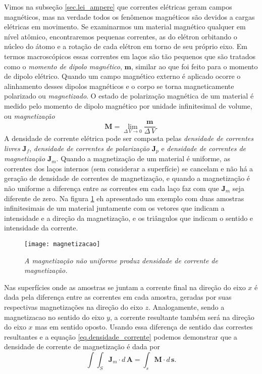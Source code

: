 Vimos na subseç\~ao \ref{sec.lei_ampere} que correntes el\'etricas geram campos magn\'eticos, mas na verdade todos os fen\^omenos magn\'eticos são devidos a cargas el\'etricas em movimento. Se examinarmos um material magn\'etico qualquer em n\'ivel at\^omico, encontraremos pequenas correntes, as do el\'etron orbitando o n\'ucleo do \'atomo e a rota\c{c}\~ao de cada el\'etron em torno de seu pr\'oprio eixo. Em termos macrosc\'opicos essas correntes em la\c{c}os s\~ao t\~ao pequenos que s\~ao tratados como o \textit{momento de dipolo magn\'etico}, $\mathbf{m}$, similar ao que foi feito para o momento de dipolo el\'etrico. Quando um campo magn\'etico externo \'e aplicado ocorre o alinhamento desses dipolos magn\'eticos e o corpo se torna magneticamente polarizado ou \textit{magnetizado}. O estado de polariza\c{c}\~ao magn\'etica de um material \'e medido pelo momento de dipolo magn\'etico por unidade infinitesimal de volume, ou \textit{magnetiza\c{c}\~ao}
\begin{equation*}
\mathbf{M}=\lim_{\Delta\,V\to 0}\frac{\mathbf{m}}{\Delta\,V}.
\end{equation*}   
A densidade de corrente el\'etrica pode ser composta pelas \textit{densidade de correntes livres} $\mathbf{J}_f$, \textit{densidade de correntes de polariza\c{c}\~ao} $\mathbf{J}_p$ e \textit{densidade de correntes de magnetiza\c{c}\~ao} $\mathbf{J}_m$. Quando a magnetiza\c{c}\~ao de um material \'e uniforme, as correntes dos la\c{c}os internos (sem considerar a superf\'icie) se cancelam e n\~ao h\'a a gera\c{c}\~ao de densidade de correntes de magnetiza\c{c}\~ao, e quando a magnetiza\c{c}\~ao \'e n\~ao uniforme a diferen\c{c}a entre as correntes em cada la\c{c}o faz com que $\mathbf{J}_m$ seja diferente de zero. Na figura \ref{fig.magnetizacao} eh apresentado um exemplo com duas amostras infinitesimais de um material juntamente com os vetores que indicam a intensidade e a dire\c{c}\~ao da magnetiza\c{c}\~ao, e os tri\^angulos que indicam o sentido e intensidade da corrente.
\begin{figure}
\centering
\texttt{[image: magnetizacao]}
\caption{\textit{A magnetiza\c{c}\~ao n\~ao uniforme produz densidade de corrente de magnetiza\c{c}\~ao.}}
\label{fig.magnetizacao}
\end{figure}     
Nas superf\'icies onde as amostras se juntam a corrente final na dire\c{c}\~ao do eixo $x$ \'e dada pela diferen\c{c}a entre as correntes em cada amostra, geradas por suas respectivas magnetiza\c{c}\~oes na dire\c{c}\~ao do eixo $z$. Analogamente, sendo a magnetizacao no sentido do eixo $y$, a corrente resultante tamb\'em ser\'a na dire\c{c}\~ao do eixo $x$ mas em sentido oposto. Usando essa diferen\c{c}a de sentido das correstes resultantes e a equa\c{c}\~ao \ref{eq.densidade_corrente} podemos demonstrar que a densidade de corrente de magnetiza\c{c}\~ao \'e dada por
\begin{equation}\label{eq.magnetizacao_densi_corrente}
\int\int_S\mathbf{J}_m\cdot d\,\mathbf{A}=\int_s \mathbf{M}\cdot d\,\mathbf{s}.
\end{equation}


